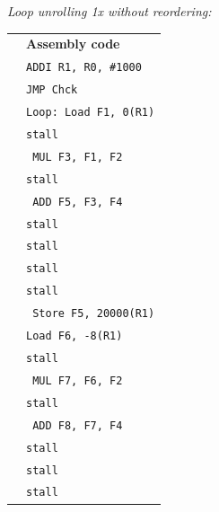 \documentclass[a4paper, 11pt]{exam}
\begin{document}
\begin{enumerate}
\begin{enumerate}
	\hfill
 
\textit{Loop unrolling 1x without reordering:}

\hfill

\begin{tabular}{ll}
	& \textbf{Assembly code }\\
	&\hspace{40pt}\texttt{ADDI R1, R0, \#1000} \\
	&\hspace{40pt}\texttt{JMP Chck}\\
	&\texttt{Loop: Load F1, 0(R1)} \\
	&\hspace{40pt}\texttt{stall}\\
    &\hspace{35pt}\texttt{ MUL F3, F1, F2}\\
    &\hspace{40pt}\texttt{stall}\\
	&\hspace{35pt}\texttt{ ADD F5, F3, F4}\\
	&\hspace{40pt}\texttt{stall}\\
	&\hspace{40pt}\texttt{stall}\\
	&\hspace{40pt}\texttt{stall}\\
	&\hspace{40pt}\texttt{stall}\\
	&\hspace{35pt}\texttt{ Store F5, 20000(R1)}\\
	&\hspace{40pt}\texttt{Load F6, -8(R1)} \\
	&\hspace{40pt}\texttt{stall}\\
    &\hspace{35pt}\texttt{ MUL F7, F6, F2}\\
    &\hspace{40pt}\texttt{stall}\\
	&\hspace{35pt}\texttt{ ADD F8, F7, F4}\\
	&\hspace{40pt}\texttt{stall}\\
	&\hspace{40pt}\texttt{stall}\\
	&\hspace{40pt}\texttt{stall}\\

\end{tabular}
\end{enumerate}
\end{enumerate}
\end{document}
